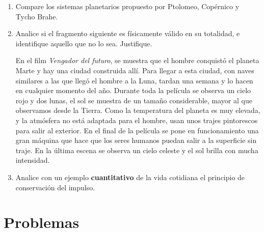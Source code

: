 \documentclass[a4paper,12pt]{article}
\begin{document}
\begin{enumerate}
\item Compare los sistemas planetarios propuesto por Ptolomeo, Copérnico y 
Tycho Brahe.
\item Analice si el fragmento siguiente es físicamente válido en su totalidad,
e identifique aquello que no lo sea. Justifique.

En el film {\emph{Vengador del futuro}}, se muestra que el hombre conquistó el
planeta Marte y hay una ciudad construida allí. Para llegar a esta ciudad, con
naves similares a las que llegó el hombre a la Luna, tardan una semana y lo
hacen en cualquier momento del año. Durante toda la película se observa un
cielo rojo y dos lunas, el sol se muestra de un tamaño considerable, mayor al
que observamos desde la Tierra. Como la temperatura del planeta es muy elevada,
y la atmósfera no está adaptada para el hombre, usan unos trajes pintorescos
para salir al exterior. En el final de la película se pone en funcionamiento
una gran máquina que hace que los seres humanos puedan salir a la superficie
sin traje.  En la última escena se observa un cielo celeste y el sol brilla con
mucha intensidad.

\item Analice con un ejemplo {\bf{cuantitativo}} de la vida cotidiana el 
principio de conservación del impulso.
\end{enumerate}

\section*{Problemas}
\end{document}
